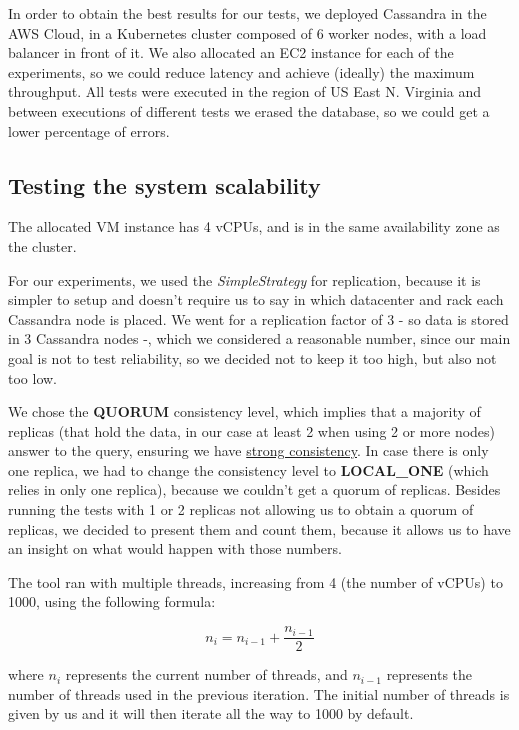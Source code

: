 \documentclass[runningheads]{llncs}
\begin{document}
In order to obtain the best results for our tests, we deployed Cassandra in the AWS Cloud, in a Kubernetes cluster composed of 6 worker nodes, with a load balancer in front of it. We also allocated an EC2 instance for each of the experiments, so we could reduce latency and achieve (ideally) the maximum throughput. All tests were executed in the region of US East N. Virginia and between executions of different tests we erased the database, so we could get a lower percentage of errors.

\subsection{Testing the system scalability}

The allocated VM instance has 4 vCPUs, and is in the same availability zone as the cluster.\par

For our experiments, we used the \emph{SimpleStrategy} for replication, because it is simpler to setup and doesn't require us to say in which datacenter and rack each Cassandra node is placed. We went for a replication factor of 3 - so data is stored in 3 Cassandra nodes -, which we considered a reasonable number, since our main goal is not to test reliability, so we decided not to keep it too high, but also not too low.\par

We chose the \textbf{QUORUM} consistency level, which implies that a majority of replicas (that hold the data, in our case at least 2 when using 2 or more nodes) answer to the query, ensuring we have \underline{strong consistency}. In case there is only one replica, we had to change the consistency level to \textbf{LOCAL\_ONE} (which relies in only one replica), because we couldn't get a quorum of replicas. Besides running the tests with 1 or 2 replicas not allowing us to obtain a quorum of replicas, we decided to present them and count them, because it allows us to have an insight on what would happen with those numbers.\par

The tool ran with multiple threads, increasing from 4 (the number of vCPUs) to 1000, using the following formula:

\[ n_i = n_{i-1} + \frac{n_{i-1}}{2} \]

where $n_i$ represents the current number of threads, and $n_{i-1}$ represents the number of threads used in the previous iteration. The initial number of threads is given by us and it will then iterate all the way to 1000 by default.
\end{document}
